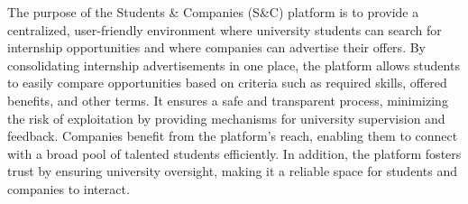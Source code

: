 \quad The purpose of the Students \& Companies (S\&C) platform is to provide a centralized, user-friendly environment where university students can search for internship opportunities and where companies can advertise their offers. By consolidating internship advertisements in one place, the platform allows students to easily compare opportunities based on criteria such as required skills, offered benefits, and other terms. It ensures a safe and transparent process, minimizing the risk of exploitation by providing mechanisms for university supervision and feedback. Companies benefit from the platform’s reach, enabling them to connect with a broad pool of talented students efficiently. In addition, the platform fosters trust by ensuring university oversight, making it a reliable space for students and companies to interact.

